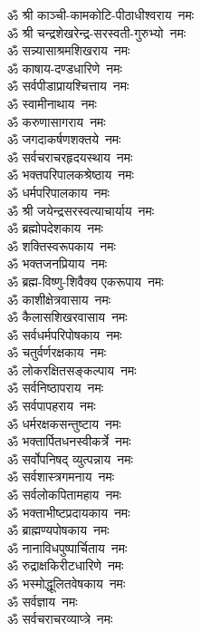 \begin{flushleft}
\begin{multicols}{2}
ॐ श्री काञ्ची-कामकोटि-पीठाधीश्वराय~नमः\\
ॐ श्री चन्द्रशेखरेन्द्र-सरस्वती-गुरुभ्यो~नमः\\
ॐ सन्न्यासाश्रमशिखराय~नमः\\
ॐ काषाय-दण्डधारिणे~नमः\\
ॐ सर्वपीडाप्रायश्चित्ताय~नमः\\
ॐ स्वामीनाथाय~नमः\\
ॐ करुणासागराय~नमः\\
ॐ जगदाकर्षणशक्तये~नमः\\
ॐ सर्वचराचरहृदयस्थाय~नमः\\
ॐ भक्तपरिपालकश्रेष्ठाय~नमः\hfill{}\\
ॐ धर्मपरिपालकाय~नमः\\
ॐ श्री जयेन्द्रसरस्वत्याचार्याय~नमः\\
ॐ ब्रह्मोपदेशकाय~नमः\\
ॐ शक्तिस्वरूपकाय~नमः\\
ॐ भक्तजनप्रियाय~नमः\\
ॐ ब्रह्म-विष्णु-शिवैक्य एकरूपाय~नमः\\
ॐ काशीक्षेत्रवासाय~नमः\\
ॐ कैलासशिखरवासाय~नमः\\
ॐ सर्वधर्मपरिपोषकाय~नमः\\
ॐ चतुर्वर्णरक्षकाय~नमः\hfill{}\\
ॐ लोकरक्षितसङ्कल्पाय~नमः\\
ॐ सर्वनिष्ठापराय~नमः\\
ॐ सर्वपापहराय~नमः\\
ॐ धर्मरक्षकसन्तुष्टाय~नमः\\
ॐ भक्तार्पितधनस्वीकर्त्रे~नमः\\
ॐ सर्वोपनिषद् व्युत्पन्नाय~नमः\\
ॐ सर्वशास्त्रगमनाय~नमः\\
ॐ सर्वलोकपितामहाय~नमः\\
ॐ भक्ताभीष्टप्रदायकाय~नमः\\
ॐ ब्राह्मण्यपोषकाय~नमः\hfill{}\\
ॐ नानाविधपुष्पार्चिताय~नमः\\
ॐ रुद्राक्षकिरीटधारिणे~नमः\\
ॐ भस्मोद्धूलितवेषकाय~नमः\\
ॐ सर्वज्ञाय~नमः\\
ॐ सर्वचराचरव्याप्त्रे~नमः\\

\end{multicols}
\end{flushleft}

